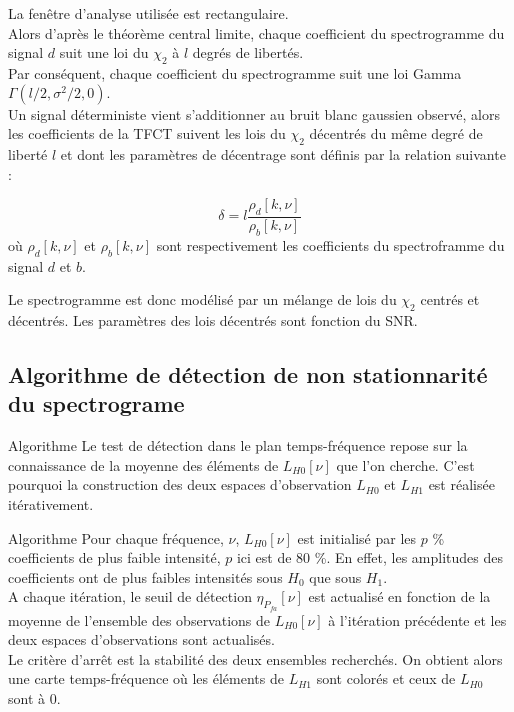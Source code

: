 \documentclass{beamer}
\begin{document}
\begin{frame}
La fenêtre d'analyse utilisée est rectangulaire.\\
Alors d'après le théorème central limite, chaque coefficient du spectrogramme du signal $d$ suit une loi du $\chi_2$ à $l$ degrés de libertés.\\
Par conséquent, chaque coefficient du spectrogramme suit une loi Gamma $\Gamma(l/2,\sigma^2/2,0).$ \\
\vspace{0.25cm}
Un signal déterministe vient s'additionner au bruit blanc gaussien observé, alors les coefficients de la TFCT suivent les lois du $\chi_2$ décentrés du même degré de liberté $l$ et dont les paramètres de décentrage sont définis par la relation suivante :

\begin{equation}
\delta = l \frac{\rho_d[k,\nu]}{\rho_b[k,\nu]}
\label{eq2}
\end{equation}
où $\rho_d[k,\nu]$ et $\rho_b[k,\nu]$ sont respectivement les coefficients du spectroframme du signal $d$ et $b$.

Le spectrogramme est donc modélisé par un mélange de lois du $\chi_2$ centrés et décentrés. Les paramètres des lois décentrés sont fonction du SNR.
\end{frame}

\subsection{Algorithme de détection de non stationnarité du spectrograme}
\begin{frame}{Algorithme}
Le test de détection dans le plan temps-fréquence repose sur la connaissance de la moyenne des éléments de $L_{H0}[\nu]$ que l'on cherche. C'est pourquoi la construction des deux espaces d'observation $L_{H0}$ et $L_{H1}$ est réalisée itérativement. 
\end{frame}

\begin{frame}
\begin{block}{Algorithme}
Pour chaque fréquence, $\nu$, $L_{H0}[\nu]$ est initialisé par les $p$ \% coefficients de plus faible intensité, $p$ ici est de 80 \%. En effet, les amplitudes des coefficients ont de plus faibles intensités sous $H_0$ que sous $H_1$. \\
A chaque itération, le seuil de détection $\eta_{P_{fa}}[\nu]$ est actualisé en fonction de la moyenne de l'ensemble des observations de $L_{H0}[\nu]$ à l'itération précédente et les deux espaces d'observations sont actualisés. \\
Le critère d'arrêt est la stabilité des deux ensembles recherchés. On obtient alors une carte temps-fréquence où les éléments de $L_{H1}$ sont colorés et ceux de $L_{H0}$ sont à 0.
\end{block}
\end{frame}
\end{document}

